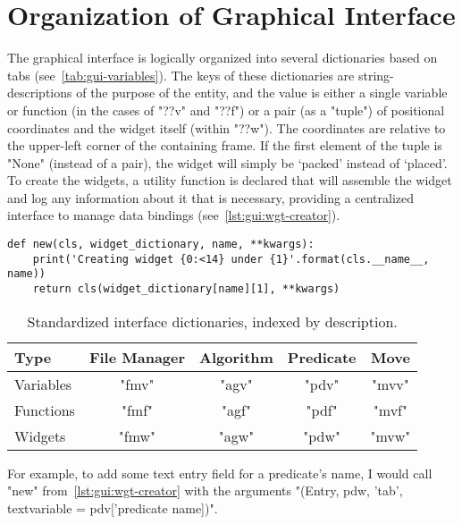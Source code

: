 \section{Organization of Graphical Interface}
\label{sec:gui-org}

The graphical interface is logically organized into several dictionaries based on tabs
  (see~\autoref{tab:gui-variables}).
The keys of these dictionaries are string-descriptions of the purpose of the entity,
  and the value is either a single variable or function (in the cases of "??v" and "??f")
  or a pair (as a "tuple") of positional coordinates and the widget itself (within "??w").
The coordinates are relative to the upper-left corner of the containing frame.
If the first element of the tuple is "None" (instead of a pair),
  the widget will simply be \enquote*{packed} instead of \enquote*{placed}.
To create the widgets, a utility function is declared that will assemble the widget
  and log any information about it that is necessary,
  providing a centralized interface to manage data bindings (see~\autoref{lst:gui:wgt-creator}).

\begin{lstlisting}[float,caption={A standardized widget creator},label={lst:gui:wgt-creator}]
def new(cls, widget_dictionary, name, **kwargs):
    print('Creating widget {0:<14} under {1}'.format(cls.__name__, name))
    return cls(widget_dictionary[name][1], **kwargs)
\end{lstlisting}
\begin{table}
  \centering
  \begin{tabular}{lcccc}
    \toprule
    Type      & File Manager & Algorithm & Predicate & Move  \\ \midrule
    Variables & "fmv"        & "agv"     & "pdv"     & "mvv" \\
    Functions & "fmf"        & "agf"     & "pdf"     & "mvf" \\
    Widgets   & "fmw"        & "agw"     & "pdw"     & "mvw" \\
    \bottomrule
  \end{tabular}
  \caption{Standardized interface dictionaries, indexed by description.}
  \label{tab:gui-variables}
\end{table}

For example, to add some text entry field for a predicate's name,
  I would call "new" from~\autoref{lst:gui:wgt-creator} with the arguments
  "(Entry, pdw, 'tab', textvariable = pdv['predicate name])".


